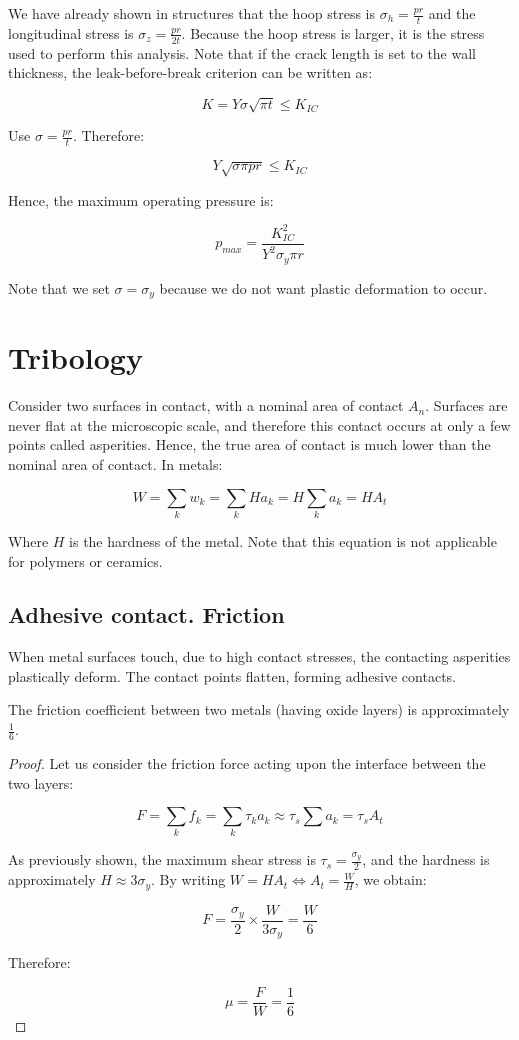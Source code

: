 \documentclass{article}
\begin{document}
We have already shown in structures that the hoop stress is $\sigma_h = \frac{pr}{t}$ and the longitudinal stress is $\sigma_z = \frac{pr}{2t}$. Because the hoop stress is larger, it is the stress used to perform this analysis. Note that if the crack length is set to the wall thickness, the leak-before-break criterion can be written as:

\[ K = Y\sigma\sqrt{\pi t} \leq K_{IC} \]

Use $\sigma = \frac{pr}{t}$. Therefore:

\[ Y\sqrt{\sigma\pi pr} \leq K_{IC} \]

Hence, the maximum operating pressure is:

\[ p_{max} = \frac{K_{IC}^2}{Y^2\sigma_y \pi r} \]

Note that we set $\sigma = \sigma_y$ because we do not want plastic deformation to occur.

\newpage

\section{Tribology}

Consider two surfaces in contact, with a nominal area of contact $A_n$. Surfaces are never flat at the microscopic scale, and therefore this contact occurs at only a few points called asperities. Hence, the true area of contact is much lower than the nominal area of contact. In metals:

\[ W = \sum_k w_k = \sum_k Ha_k = H\sum_k a_k = HA_t \]

Where $H$ is the hardness of the metal. Note that this equation is not applicable for polymers or ceramics.

\subsection{Adhesive contact. Friction}

When metal surfaces touch, due to high contact stresses, the contacting asperities plastically deform. The contact points flatten, forming adhesive contacts.

\begin{proposition}
    The friction coefficient between two metals (having oxide layers) is approximately $\frac{1}{6}$.
\end{proposition}

\begin{proof}
    Let us consider the friction force acting upon the interface between the two layers:

    \[ F = \sum_k f_k = \sum_k \tau_k a_k \approx \tau_s \sum a_k = \tau_s A_t \]

    As previously shown, the maximum shear stress is $\tau_s = \frac{\sigma_y}{2}$, and the hardness is approximately $H \approx 3\sigma_y$. By writing $W = HA_t \iff A_t = \frac{W}{H}$, we obtain:

    \[ F = \frac{\sigma_y}{2} \times \frac{W}{3\sigma_y} = \frac{W}{6} \]

    Therefore:

    \[ \mu = \frac{F}{W} = \frac{1}{6} \]
\end{proof}
\end{document}
